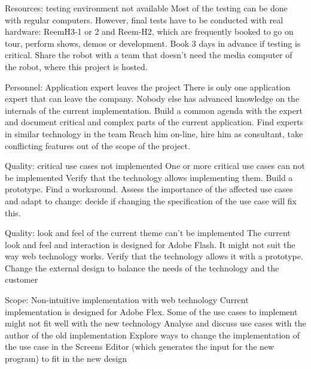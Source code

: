 \begin{risk}
{Resources: testing environment not available}
{Most of the testing can be done with regular computers. However, final tests have to be conducted with real hardware: ReemH3-1 or 2 and Reem-H2, which are frequently booked to go on tour, perform shows, demos or development.}
{Book 3 days in advance if testing is critical. }
{Share the robot with a team that doesn't need the media computer of the robot, where this project is hosted.}
\end{risk}

\begin{risk}
{Personnel: Application expert leaves the project}
{There is only one application expert that can leave the company. Nobody else has advanced knowledge on the internals of the current implementation.}
{Build a common agenda with the expert and document critical and complex parts of the current application. Find experts in similar technology in the team}
{Reach him on-line, hire him as consultant, take conflicting features out of the scope of the project.}
\end{risk}

\begin{risk}
{Quality: critical use cases not implemented}
{One or more critical use cases can not be implemented}
{Verify that the technology allows implementing them. Build a prototype. }
{Find a workaround. Assess the importance of the affected use cases and adapt to change: decide if changing the specification of the use case will fix this.}
\end{risk}

\begin{risk}
{Quality: look and feel of the current theme can't be implemented}
{The current look and feel and interaction is designed for Adobe Flash. It might not suit the way web technology works.}
{Verify that the technology allows it with a prototype.}
{Change the external design to balance the needs of the technology and the customer}
\end{risk}

\begin{risk}
{Scope: Non-intuitive implementation with web technology}
{Current implementation is designed for Adobe Flex. Some of the use cases to implement might not fit well with the new technology}
{Analyse and discuss use cases with the author of the old implementation}
{Explore ways to change the implementation of the use case in the Screens Editor (which generates the input for the new program) to fit in the new design}
\end{risk}

